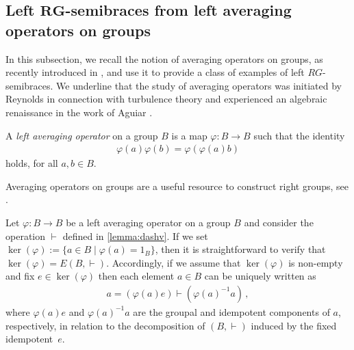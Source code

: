 \documentclass[11pt]{amsart}
\newtheorem{lemma}[theorem]{Lemma}
\newtheorem{definition}[theorem]{Definition}
\theoremstyle{definition}
\begin{document}
\subsection{\texorpdfstring{Left $\mathbf{RG}$-}{-}semibraces from left averaging operators on groups}
In this subsection, we recall the notion of averaging operators on groups, as recently introduced in \cite{HuhuXing25}, and use it to provide a class of examples of left $RG$-semibraces. We underline that the study of averaging operators was initiated by Reynolds \cite{Rey} in connection with turbulence theory and experienced an algebraic renaissance in the work of Aguiar \cite{Aguiar00}.

\medskip

    A \emph{left averaging operator} on a group $B$ is a map ${\varphi}:B \to B$ such that the identity
    \begin{align*}
        {\varphi}(a){\varphi}(b) = {\varphi}\left( {\varphi}(a) b \right) 
    \end{align*}
    holds, for all $a,b \in B$.

\smallskip

Averaging operators on groups are a useful resource to construct right groups, see \cite[Proposition 3.8]{HuhuXing25}.

Let ${\varphi}:B \to B$ be a left averaging operator on a group $B$ and consider the operation $\vdash$ defined in \cref{lemma:dashv}.
If we set $\ker({\varphi}) := \{a \in B \mid {\varphi}(a) = 1_B \}$, then it is straightforward to verify that $\ker({\varphi}) = E(B,\vdash)$.
Accordingly, if we assume that $\ker(\varphi)$ is non-empty and fix $e \in \ker({\varphi})$ then each element $a \in B$ can be uniquely written as
\begin{align*}
    a = \left({\varphi}(a)e \right) \vdash \left( {\varphi}(a)^{-1}a \right) \,,
\end{align*}
where ${\varphi}(a)e$ and ${\varphi}(a)^{-1}a$ are the groupal and idempotent components of $a$, respectively, in relation to the decomposition of $(B,\vdash)$ induced by the fixed idempotent~$e$.
\end{document}
